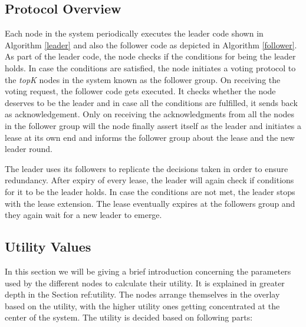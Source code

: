 \documentclass[a4paper,11pt]{kth-mag}
\begin{document}
\subsection{Protocol Overview}

Each node in the system periodically executes the leader code shown in Algorithm \ref{leader} and also the follower code as depicted in Algorithm \ref{follower}. As part of the leader code, the node checks if the conditions for being the leader holds. In case the conditions are satisfied, the node initiates a voting protocol to the \textit{topK} nodes in the system known as the follower group. On receiving the voting request, the follower code gets executed. It checks whether the node deserves to be the leader and in case all the conditions are fulfilled, it sends back as acknowledgement. Only on receiving the acknowledgments from all the nodes in the follower group will the node finally assert itself as the leader and initiates a lease at its own end and informs the follower group about the lease and the new leader round.
\par The leader uses its followers to replicate the decisions taken in order to ensure redundancy. After expiry of every lease, the leader will again check if conditions for it to be the leader holds. In case the conditions are not met, the leader stops with the lease extension. The lease eventually expires at the followers group and they again wait for a new leader to emerge.


\subsection{Utility Values}


In this section we will be giving a brief introduction concerning the parameters used by the different nodes to calculate their utility. It is explained in greater depth in the Section {ref:utility}. The nodes arrange themselves in the overlay based on the utility, with the higher utility ones getting concentrated at the center of the system. The utility is decided based on following parts:
\end{document}
